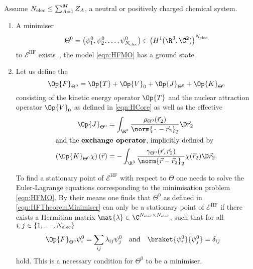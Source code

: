 \begin{thm}
	\label{thm:MathematicalHF}
	Assume $N_\text{elec} \leq \sum_{A=1}^M Z_A$, \ie a neutral or positively charged chemical system.
	\begin{enumerate}
		\item A minimiser
			\begin{equation}
				\Theta^0 = \left(\psi_1^0, \psi_2^0, \ldots, \psi_{\Nelec}^0 \right)
					\in \left( H^1(\R^3, \C^2) \right)^{\Nelec}
				\label{eqn:HFTheoremMinimiser}
			\end{equation}
			to $\mathcal{E}^\text{HF}$ exists~\cite{Lieb1977},
			\ie the \HF model \eqref{eqn:HFMO} has a ground state.
		\item Let us define the 
			\begin{equation}
				\Op{F}_{\Theta^0} = \Op{T} + \Op{V}_0 + \Op{J}_{\Theta^0} + \Op{K}_{\Theta^0}
				\label{eqn:FockOperator}
			\end{equation}
			consisting of the kinetic energy operator $\Op{T}$ and
			the nuclear attraction operator $\Op{V}_0$ as defined in \eqref{eqn:HCore}
			as well as the effective 
			\begin{align}
				\label{eqn:OperatorCoulomb}
					\Op{J}_{\Theta^0} &= \int_{\R^3} \frac{\rho_{\Theta^0}(\vec{r}_2)}
						{\norm{\slot - \vec{r}_2}_2} \D \vec{r}_2 \\
				\intertext{and the \newterm{exchange operator}, implicitly defined by}
					\left( \Op{K}_{\Theta^0} \chi \right)(\vec{r})
					&= - \int_{\R^3} \frac{\gamma_{\Theta^0}(\vec{r}, \vec{r}_2)}
						{\norm{\vec{r} - \vec{r}_2}_2} \chi(\vec{r}_2) \D \vec{r}_2.
				\label{eqn:OperatorExchange}
			\end{align}

			To find a stationary point of $\mathcal{E}^\text{HF}$ with respect to $\Theta$
			one needs to solve the Euler-Lagrange equations corresponding to the minimisation
			problem \eqref{eqn:HFMO}.
			By their means one finds that $\Theta^0$
			as defined in \eqref{eqn:HFTheoremMinimiser}
			can only be a stationary point of $\mathcal{E}^\text{HF}$ if
			there exists a Hermitian matrix $\mat{\lambda} \in \C^{\Nelec\times\Nelec}$,
			such that for all $i,j \in \{1,\ldots,N_\text{elec}\}$
			\begin{align}
				\label{eqn:EulerLagrangeHF}
				\Op{F}_{\Theta^0} \psi_i^0 &= \sum_{ij} \lambda_{ij} \psi_j^0
				&&\text{and}&
				\braket{\psi_i^0}{\psi_j^0} &= \delta_{ij}
			\end{align}
			hold.
			This is a necessary condition for $\Theta^0$ to be a minimiser.


\end{enumerate}
\end{thm}
